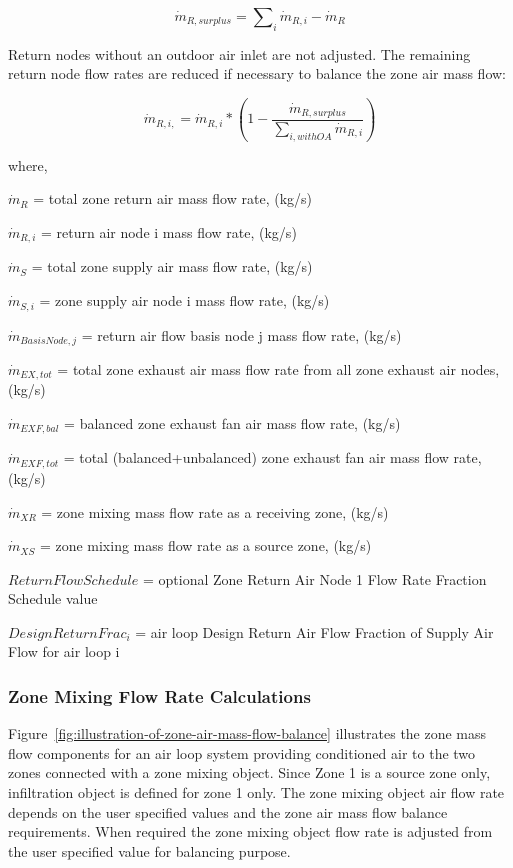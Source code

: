 \begin{equation}
{\dot m_{R,surplus}} = \sum\nolimits_i {{{\dot m}_{R,i}}} - {\dot m_{R}}
\end{equation}

Return nodes without an outdoor air inlet are not adjusted. The remaining return node flow rates are reduced if necessary to balance the zone air mass flow:

\begin{equation}
{\dot m_{R,i,}} = {\dot m_{R,i}} * \left( 1 - \frac{\dot m_{R,surplus}} {\sum\nolimits_{i,withOA} {{{\dot m}_{R,i}}}} \right) 
\end{equation}


where,

\({\dot m_{R}}\) = total zone return air mass flow rate, (kg/s)

\({\dot m_{R,i}}\) = return air node i mass flow rate, (kg/s)

\({\dot m_{S}}\) = total zone supply air mass flow rate, (kg/s)

\({\dot m_{S,i}}\) = zone supply air node i mass flow rate, (kg/s)

\({\dot m_{Basis Node,j}}\) = return air flow basis node j mass flow rate, (kg/s)

\({\dot m_{EX,tot}}\) = total zone exhaust air mass flow rate from all zone exhaust air nodes, (kg/s)

\({\dot m_{EXF,bal}}\) = balanced zone exhaust fan air mass flow rate, (kg/s)

\({\dot m_{EXF,tot}}\) = total (balanced+unbalanced) zone exhaust fan air mass flow rate, (kg/s)

\({\dot m_{XR}}\) = zone mixing mass flow rate as a receiving zone, (kg/s)

\({\dot m_{XS}}\) = zone mixing mass flow rate as a source zone, (kg/s)

\(ReturnFlowSchedule\) = optional Zone Return Air Node 1 Flow Rate Fraction Schedule value

\({DesignReturnFrac_i}\) = air loop Design Return Air Flow Fraction of Supply Air Flow for air loop i

\subsubsection{Zone Mixing Flow Rate Calculations}\label{zone-mixing-flow-rate-calculations}

Figure~\ref{fig:illustration-of-zone-air-mass-flow-balance} illustrates the zone mass flow components for an air loop system providing conditioned air to the two zones connected with a zone mixing object. Since Zone 1 is a source zone only, infiltration object is defined for zone 1 only. The zone mixing object air flow rate depends on the user specified values and the zone air mass flow balance requirements. When required the zone mixing object flow rate is adjusted from the user specified value for balancing purpose.

